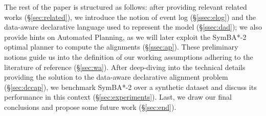 The rest of the paper is structured as follows: after providing relevant related works (\S\ref{sec:related}), we introduce the notion of event log (\S\ref{ssec:elog}) and the data-aware declarative language used to represent the model (\S\ref{ssec:dad}); we also provide hints on Automated Planning, as we will later exploit the SymBA*-2 optimal planner \cite{torralba2014symba} to compute the alignments (\S\ref{ssec:ap}). These preliminary notions guide us into the definition of our  working assumptions adhering to the literature of reference (\S\ref{sec:wa}). After deep-diving into the technical details providing the solution to the data-aware declarative alignment problem (\S\ref{sec:dccap}), we benchmark SymBA*-2 over a synthetic dataset and discuss its performance in this context (\S\ref{sec:experiments}). Last, we draw our final conclusions and propose some future work (\S\ref{sec:end}).


